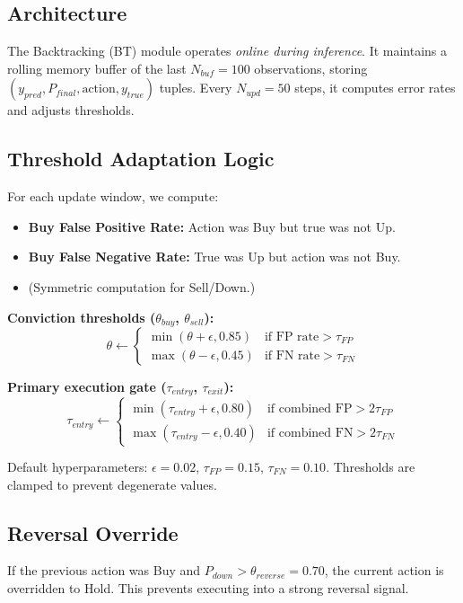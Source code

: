 \documentclass[conference]{IEEEtran}
\begin{document}
\subsection{Architecture}
The Backtracking (BT) module operates \textit{online during inference}.
It maintains a rolling memory buffer of the last $N_{buf}=100$ observations,
storing $(y_{pred}, P_{final}, \text{action}, y_{true})$ tuples. Every
$N_{upd}=50$ steps, it computes error rates and adjusts thresholds.

\subsection{Threshold Adaptation Logic}
For each update window, we compute:
\begin{itemize}
    \item \textbf{Buy False Positive Rate:} Action was Buy but true was not Up.
    \item \textbf{Buy False Negative Rate:} True was Up but action was not Buy.
    \item (Symmetric computation for Sell/Down.)
\end{itemize}

\textbf{Conviction thresholds ($\theta_{buy}$, $\theta_{sell}$):}
\begin{equation}
    \theta \leftarrow \begin{cases}
        \min(\theta + \epsilon, 0.85) & \text{if FP rate} > \tau_{FP} \\
        \max(\theta - \epsilon, 0.45) & \text{if FN rate} > \tau_{FN}
    \end{cases}
\end{equation}

\textbf{Primary execution gate ($\tau_{entry}$, $\tau_{exit}$):}
\begin{equation}
    \tau_{entry} \leftarrow \begin{cases}
        \min(\tau_{entry} + \epsilon, 0.80) & \text{if combined FP} > 2\tau_{FP} \\
        \max(\tau_{entry} - \epsilon, 0.40) & \text{if combined FN} > 2\tau_{FN}
    \end{cases}
\end{equation}

Default hyperparameters: $\epsilon=0.02$, $\tau_{FP}=0.15$, $\tau_{FN}=0.10$.
Thresholds are clamped to prevent degenerate values.

\subsection{Reversal Override}
If the previous action was Buy and $P_{down} > \theta_{reverse}=0.70$,
the current action is overridden to Hold. This prevents executing into
a strong reversal signal.
\end{document}
